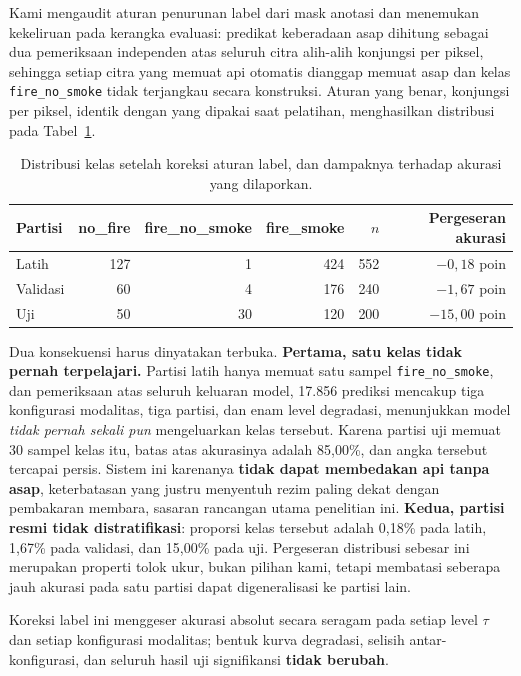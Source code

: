 Kami mengaudit aturan penurunan label dari mask anotasi dan menemukan kekeliruan
pada kerangka evaluasi: predikat keberadaan asap dihitung sebagai dua
pemeriksaan independen atas seluruh citra alih-alih konjungsi per piksel,
sehingga setiap citra yang memuat api otomatis dianggap memuat asap dan kelas
\texttt{fire\_no\_smoke} tidak terjangkau secara konstruksi. Aturan yang
benar, konjungsi per piksel, identik dengan yang dipakai saat
pelatihan, menghasilkan distribusi pada Tabel~\ref{tab:distribusi}.

\begin{table}[!htbp]
\caption{Distribusi kelas setelah koreksi aturan label, dan dampaknya terhadap
akurasi yang dilaporkan.}
\label{tab:distribusi}
\centering
\begin{tabular}{lrrrrr}
\hline
\textbf{Partisi} & \textbf{no\_fire} & \textbf{fire\_no\_smoke} & \textbf{fire\_smoke}
& \textbf{$n$} & \textbf{Pergeseran akurasi} \\
\hline
Latih     & 127 & 1  & 424 & 552 & $-0{,}18$ poin \\
Validasi  & 60  & 4  & 176 & 240 & $-1{,}67$ poin \\
Uji       & 50  & 30 & 120 & 200 & $-15{,}00$ poin \\
\hline
\end{tabular}
\end{table}

Dua konsekuensi harus dinyatakan terbuka. \textbf{Pertama, satu kelas tidak
pernah terpelajari.} Partisi latih hanya memuat satu sampel
\texttt{fire\_no\_smoke}, dan pemeriksaan atas seluruh keluaran model, 17.856
prediksi mencakup tiga konfigurasi modalitas, tiga partisi, dan enam level
degradasi, menunjukkan model \emph{tidak pernah sekali pun} mengeluarkan kelas
tersebut. Karena partisi uji memuat 30 sampel kelas itu, batas atas akurasinya
adalah 85{,}00\%, dan angka tersebut tercapai persis. Sistem ini karenanya
\textbf{tidak dapat membedakan api tanpa asap}, keterbatasan yang justru
menyentuh rezim paling dekat dengan pembakaran membara, sasaran rancangan utama
penelitian ini. \textbf{Kedua, partisi resmi tidak distratifikasi}: proporsi
kelas tersebut adalah 0{,}18\% pada latih, 1{,}67\% pada validasi, dan 15{,}00\%
pada uji. Pergeseran distribusi sebesar ini merupakan properti tolok ukur, bukan
pilihan kami, tetapi membatasi seberapa jauh akurasi pada satu partisi dapat
digeneralisasi ke partisi lain.

Koreksi label ini menggeser akurasi absolut secara seragam pada setiap level
$\tau$ dan setiap konfigurasi modalitas; bentuk kurva degradasi, selisih
antar-konfigurasi, dan seluruh hasil uji signifikansi \textbf{tidak berubah}.

